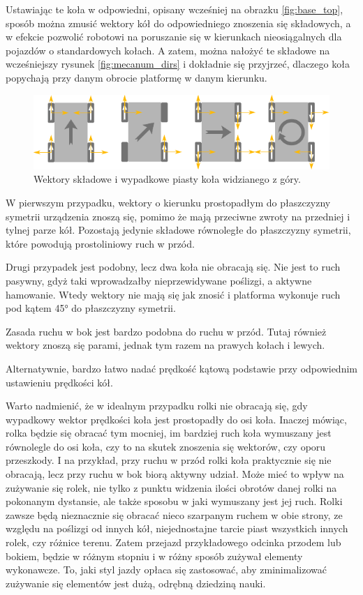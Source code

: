 	Ustawiając te koła w odpowiedni, opisany wcześniej na obrazku \ref{fig:base_top}, sposób można zmusić wektory kół do odpowiedniego znoszenia się składowych,
	a w efekcie pozwolić robotowi na poruszanie się w kierunkach nieosiągalnych dla pojazdów o standardowych kołach.
	A zatem, można nałożyć te składowe na wcześniejszy rysunek \ref{fig:mecanum_dirs} i dokładnie się przyjrzeć, dlaczego koła popychają przy danym obrocie platformę w 
	danym kierunku.

	\begin{figure}[H]
	\centering
	\includegraphics[width=\textwidth]{graphics/mecanum_dirs_vect.pdf}
	\caption{Wektory składowe i wypadkowe piasty koła widzianego z góry.}
	\label{fig:mecanum_dirs_vect}
	\end{figure} 

	W pierwszym przypadku, wektory o kierunku prostopadłym do płaszczyzny symetrii urządzenia znoszą się, pomimo że mają przeciwne zwroty na przedniej i tylnej parze kół.
	Pozostają jedynie składowe równoległe do płaszczyzny symetrii, które powodują prostoliniowy ruch w przód.

	Drugi przypadek jest podobny, lecz dwa koła nie obracają się. Nie jest to ruch pasywny, gdyż taki wprowadzałby nieprzewidywane poślizgi, a aktywne hamowanie.
	Wtedy wektory nie mają się jak znosić i platforma wykonuje ruch pod kątem 45° do płaszczyzny symetrii.

	Zasada ruchu w bok jest bardzo podobna do ruchu w przód. Tutaj również wektory znoszą się parami, jednak tym razem na prawych kołach i lewych.

	Alternatywnie, bardzo łatwo nadać prędkość kątową podstawie przy odpowiednim ustawieniu prędkości kół.

	Warto nadmienić, że w idealnym przypadku rolki nie obracają się, gdy wypadkowy wektor prędkości koła jest prostopadły do osi koła. 
	Inaczej mówiąc, rolka będzie się obracać tym mocniej, im bardziej ruch koła wymuszany jest równolegle do osi koła, 
	czy to na skutek znoszenia się wektorów, czy oporu przeszkody.
	I na przykład, przy ruchu w przód rolki koła praktycznie się nie obracają, lecz przy ruchu w bok biorą aktywny udział.
	Może mieć to wpływ na zużywanie się rolek, nie tylko z punktu widzenia ilości obrotów danej rolki na pokonanym dystansie, 
	ale także sposobu w jaki wymuszany jest jej ruch.
	Rolki zawsze będą nieznacznie się obracać nieco szarpanym ruchem w obie strony, ze względu na poślizgi od innych kół, 
	niejednostajne tarcie piast wszystkich innych rolek, czy różnice terenu. 
	Zatem przejazd przykładowego odcinka przodem lub bokiem, będzie w różnym stopniu i w różny sposób zużywał elementy wykonawcze.
	To, jaki styl jazdy opłaca się zastosować, aby zminimalizować zużywanie się elementów jest dużą, odrębną dziedziną nauki.

